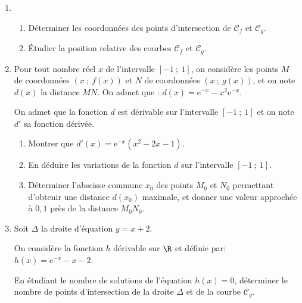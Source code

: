 \begin{enumerate}
\item 
	\begin{enumerate}
		\item Déterminer les coordonnées des points d'intersection de $\mathcal{C}_f$ et $\mathcal{C}_g$.
		\item Étudier la position relative des courbes $\mathcal{C}_f$ et $\mathcal{C}_g$.
	\end{enumerate}
\item  Pour tout nombre réel $x$ de l'intervalle $[-1~;~1]$, on considère les points $M$ de coordonnées $(x~;~f(x))$ et $N$ de coordonnées $(x~;~g(x))$, et on note $d(x)$ la distance $MN$. On admet que : $d(x)= \text{e}^{-x} - x^2\text{e}^{-x}$.

On admet que la fonction $d$ est dérivable sur l'intervalle $[-1~;~1]$ et on note $d'$ sa fonction dérivée.
	\begin{enumerate}
		\item Montrer que $d'(x) = \text{e}^{-x}\left(x^2 - 2x - 1\right)$. 
		\item En déduire les variations de la fonction $d$ sur l'intervalle $[-1~;~1]$.
		\item Déterminer l'abscisse commune $x_0$ des points $M_0$ et $N_0$ permettant d'obtenir une
distance $d\left(x_0\right)$ maximale, et donner une valeur approchée à $0,1$ près de la distance $M_0N_0$.
	\end{enumerate}
\item  Soit $\Delta$ la droite d'équation $y = x + 2$.

On considère la fonction $h$ dérivable sur $\R$ et définie par: $h(x) = \text{e}^{-x} - x - 2$.

En étudiant le nombre de solutions de l'équation $h(x) = 0$, déterminer le nombre de points d'intersection de la droite $\Delta$ et de la courbe $\mathcal{C}_g$.
\end{enumerate}

